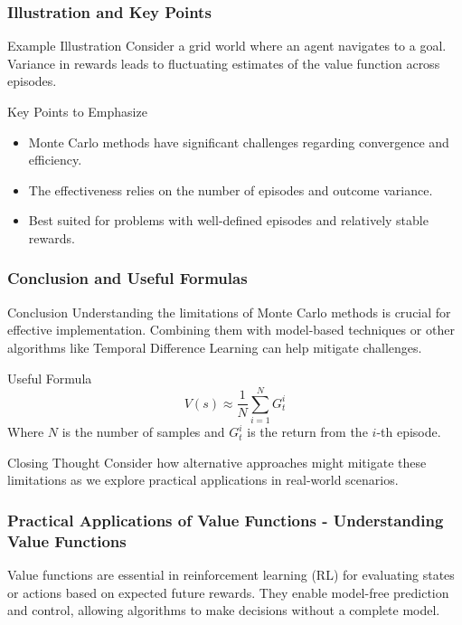 \documentclass[aspectratio=169]{beamer}
\begin{document}
\begin{frame}[fragile]
    \frametitle{Illustration and Key Points}
    \begin{block}{Example Illustration}
        Consider a grid world where an agent navigates to a goal. Variance in rewards leads to fluctuating estimates of the value function across episodes.
    \end{block}

    \begin{block}{Key Points to Emphasize}
        \begin{itemize}
            \item Monte Carlo methods have significant challenges regarding convergence and efficiency.
            \item The effectiveness relies on the number of episodes and outcome variance.
            \item Best suited for problems with well-defined episodes and relatively stable rewards.
        \end{itemize}
    \end{block}
\end{frame}

\begin{frame}[fragile]
    \frametitle{Conclusion and Useful Formulas}
    \begin{block}{Conclusion}
        Understanding the limitations of Monte Carlo methods is crucial for effective implementation. Combining them with model-based techniques or other algorithms like Temporal Difference Learning can help mitigate challenges.
    \end{block}

    \begin{block}{Useful Formula}
        \begin{equation}
        V(s) \approx \frac{1}{N} \sum_{i=1}^{N} G_t^i 
        \end{equation}
        Where \( N \) is the number of samples and \( G_t^i \) is the return from the \( i \)-th episode.
    \end{block}
    
    \begin{block}{Closing Thought}
        Consider how alternative approaches might mitigate these limitations as we explore practical applications in real-world scenarios.
    \end{block}
\end{frame}

\begin{frame}[fragile]
  \frametitle{Practical Applications of Value Functions - Understanding Value Functions}
  
  Value functions are essential in reinforcement learning (RL) for evaluating states or actions based on expected future rewards. They enable model-free prediction and control, allowing algorithms to make decisions without a complete model.
  
\end{frame}
\end{document}
